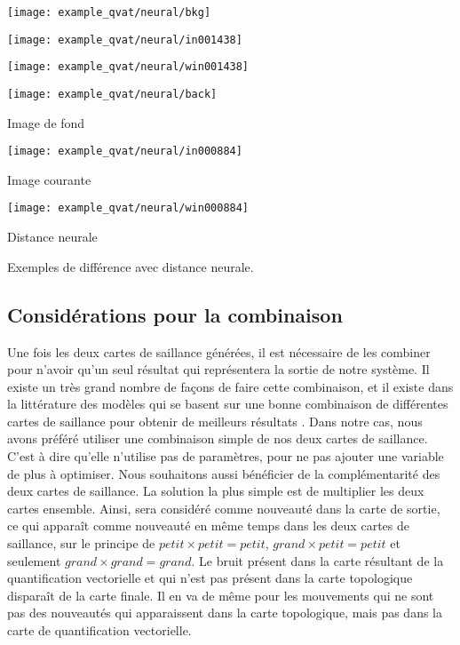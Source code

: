 	\begin{figureth}
		\begin{subfigureth}{.32\textwidth}
			\texttt{[image: example\_qvat/neural/bkg]}
		\end{subfigureth}
		\begin{subfigureth}{.32\textwidth}
			\texttt{[image: example\_qvat/neural/in001438]}
		\end{subfigureth}
		\begin{subfigureth}{.32\textwidth}
			\texttt{[image: example\_qvat/neural/win001438]}
		\end{subfigureth}

		\begin{subfigureth}{.32\textwidth}
			\texttt{[image: example\_qvat/neural/back]} \caption{Image de fond}
		\end{subfigureth}
		\begin{subfigureth}{.32\textwidth}
			\texttt{[image: example\_qvat/neural/in000884]} \caption{Image courante}
		\end{subfigureth}
		\begin{subfigureth}{.32\textwidth}
			\texttt{[image: example\_qvat/neural/win000884]} \caption{Distance neurale}
		\end{subfigureth}

		\caption{Exemples de différence avec distance neurale.}\label{fig:visu-tp}
	\end{figureth}

	\subsection{Considérations pour la combinaison}\label{seq:combinaison}
	
	Une fois les deux cartes de saillance générées, il est nécessaire de les combiner pour n'avoir qu'un seul résultat qui représentera la sortie de notre système. Il existe un très grand nombre de façons de faire cette combinaison, et il existe dans la littérature des modèles qui se basent sur une bonne combinaison de différentes cartes de saillance pour obtenir de meilleurs résultats \cite{bianco2017combination}. Dans notre cas, nous avons préféré utiliser une combinaison simple de nos deux cartes de saillance. C'est à dire qu'elle n'utilise pas de paramètres, pour ne pas ajouter une variable de plus à optimiser. Nous souhaitons aussi bénéficier de la complémentarité des deux cartes de saillance. La solution la plus simple est de multiplier les deux cartes ensemble. Ainsi, sera considéré comme nouveauté dans la carte de sortie, ce qui apparaît comme nouveauté en même temps dans les deux cartes de saillance, sur le principe de $\textit{petit} \times \textit{petit} = \textit{petit}$, $\textit{grand} \times \textit{petit} = \textit{petit}$ et seulement $\textit{grand} \times \textit{grand} = \textit{grand}$. Le bruit présent dans la carte résultant de la quantification vectorielle et qui n'est pas présent dans la carte topologique disparaît de la carte finale. Il en va de même pour les mouvements qui ne sont pas des nouveautés qui apparaissent dans la carte topologique, mais pas dans la carte de quantification vectorielle.

